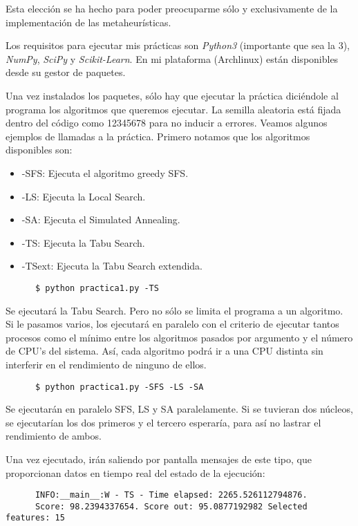 \documentclass[a4paper, 11pt]{article}
\begin{document}
    Esta elección se ha hecho para poder preocuparme sólo y exclusivamente de la implementación de las metaheurísticas.

    Los requisitos para ejecutar mis prácticas son \emph{Python3} (importante que sea la 3), \emph{NumPy}, \emph{SciPy} y \emph{Scikit-Learn}. En mi plataforma (Archlinux) están disponibles desde su gestor de paquetes.

    Una vez instalados los paquetes, sólo hay que ejecutar la práctica diciéndole al programa los algoritmos que queremos ejecutar. La semilla aleatoria está fijada dentro del código como 12345678 para no inducir a errores. Veamos algunos ejemplos de llamadas a la práctica. Primero notamos que los algoritmos disponibles son:

    \begin{itemize}
      \item -SFS: Ejecuta el algoritmo greedy SFS.
      \item -LS: Ejecuta la Local Search.
      \item -SA: Ejecuta el Simulated Annealing.
      \item -TS: Ejecuta la Tabu Search.
      \item -TSext: Ejecuta la Tabu Search extendida.
    \end{itemize}

    \begin{verbatim}
      $ python practica1.py -TS
    \end{verbatim}
    Se ejecutará la Tabu Search. Pero no sólo se limita el programa a un algoritmo. Si le pasamos varios, los ejecutará en paralelo con el criterio de ejecutar tantos procesos como el mínimo entre los algoritmos pasados por argumento y el número de CPU's del sistema. Así, cada algoritmo podrá ir a una CPU distinta sin interferir en el rendimiento de ninguno de ellos.

    \begin{verbatim}
      $ python practica1.py -SFS -LS -SA
    \end{verbatim}
    Se ejecutarán en paralelo SFS, LS y SA paralelamente. Si se tuvieran dos núcleos, se ejecutarían los dos primeros y el tercero esperaría, para así no lastrar el rendimiento de ambos.

    Una vez ejecutado, irán saliendo por pantalla mensajes de este tipo, que proporcionan datos en tiempo real del estado de la ejecución:

    \begin{verbatim}
      INFO:__main__:W - TS - Time elapsed: 2265.526112794876.
      Score: 98.2394337654. Score out: 95.0877192982 Selected features: 15
    \end{verbatim}
\end{document}

